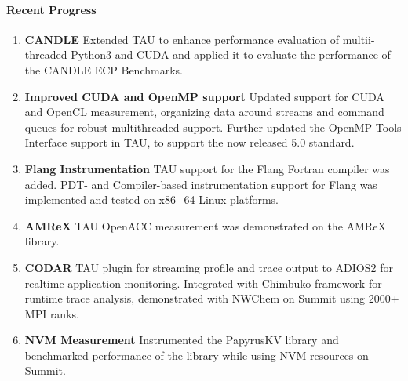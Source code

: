 \paragraph{Recent Progress}
\begin{enumerate}
\item \textbf{CANDLE} Extended TAU to enhance performance evaluation of multii-threaded Python3 and CUDA and applied it to evaluate the performance of the CANDLE ECP Benchmarks.

\item \textbf{Improved CUDA and OpenMP support} Updated support for CUDA and OpenCL measurement, organizing data around streams and command queues for robust multithreaded support.  Further updated the OpenMP Tools Interface support in TAU, to support the now released 5.0 standard. 

\item \textbf{Flang Instrumentation} TAU support for the Flang Fortran compiler was added.  PDT- and Compiler-based instrumentation support for Flang was implemented and tested on x86\_64 Linux platforms.

\item \textbf{AMReX} TAU OpenACC measurement was demonstrated on the AMReX library.

\item \textbf{CODAR} TAU plugin for streaming profile and trace output to ADIOS2 for realtime application monitoring.  Integrated with Chimbuko framework for runtime trace analysis, demonstrated with NWChem on Summit using 2000+ MPI ranks.

\item \textbf{NVM Measurement} Instrumented the PapyrusKV library and benchmarked performance of the library while using NVM resources on Summit.
\end{enumerate}

